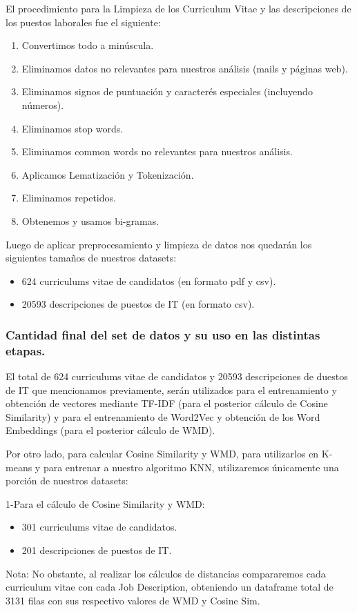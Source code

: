 \documentclass[12pt,a4paper]{article}
\begin{document}
\begin{sloppypar}
El procedimiento para la Limpieza de los Curriculum Vitae y las descripciones de los puestos laborales fue el siguiente:

\begin{enumerate}
\item Convertimos todo a minúscula.
\item Eliminamos datos no relevantes para nuestros análisis (mails y páginas web).
\item Eliminamos signos de puntuación y caracterés especiales (incluyendo números).
\item Eliminamos stop words.
\item Eliminamos common words no relevantes para nuestros análisis.
\item Aplicamos Lematización y Tokenización.
\item Eliminamos repetidos.
\item Obtenemos y usamos bi-gramas.
\end{enumerate}

Luego de aplicar preprocesamiento y limpieza de datos nos quedarán los siguientes tamaños de nuestros datasets:
\begin{itemize}
\item 624 curriculums vitae de candidatos (en formato pdf y csv).
\item 20593 descripciones de puestos de IT (en formato csv).
\end{itemize}

\cleardoublepage

\subsubsection{Cantidad final del set de datos y su uso en las distintas etapas.}

El total de 624 curriculums vitae de candidatos y 20593 descripciones de duestos de IT que mencionamos previamente, serán utilizados para el entrenamiento y obtención de vectores mediante TF-IDF (para el posterior cálculo de Cosine Similarity) y para el entrenamiento de Word2Vec y obtención de los Word Embeddings (para el posterior cálculo de WMD).

Por otro lado, para calcular Cosine Similarity y WMD, para utilizarlos en K-means y para entrenar a nuestro algoritmo KNN, utilizaremos únicamente una porción de nuestros datasets:

1-Para el cálculo de Cosine Similarity y WMD:
\begin{itemize}
\item 301 curriculums vitae de candidatos.
\item 201 descripciones de puestos de IT.
\end{itemize}
Nota: No obstante, al realizar los cálculos de distancias compararemos cada curriculum vitae con cada Job Description, obteniendo un dataframe total de 3131 filas con sus respectivo valores de WMD y Cosine Sim.


\end{sloppypar}
\end{document}
